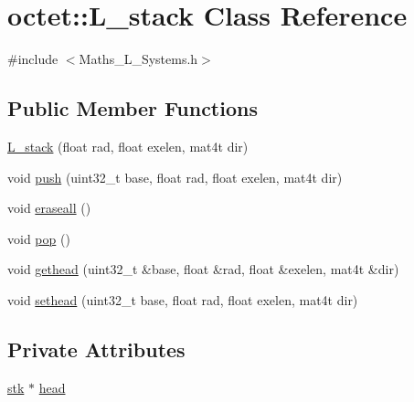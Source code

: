 \hypertarget{classoctet_1_1_l__stack}{\section{octet\+:\+:L\+\_\+stack Class Reference}
\label{classoctet_1_1_l__stack}
}


{\ttfamily \#include $<$Maths\+\_\+\+L\+\_\+\+Systems.\+h$>$}

\subsection*{Public Member Functions}
\begin{DoxyCompactItemize}
\item 
\hyperlink{classoctet_1_1_l__stack_ae51f0abbe777ff635c9222baa23ca49b}{L\+\_\+stack} (float rad, float exelen, mat4t dir)
\item 
void \hyperlink{classoctet_1_1_l__stack_a6ef4bc87ed8db542421d2f8d628d21b7}{push} (uint32\+\_\+t base, float rad, float exelen, mat4t dir)
\item 
void \hyperlink{classoctet_1_1_l__stack_a1d826ecee8e7a32fff42793bedbd1988}{eraseall} ()
\item 
void \hyperlink{classoctet_1_1_l__stack_a7801139caf6842abd54c37c1cd230f1d}{pop} ()
\item 
void \hyperlink{classoctet_1_1_l__stack_ac6ac5ce8c5ed4827eb02cae7a1539a61}{gethead} (uint32\+\_\+t \&base, float \&rad, float \&exelen, mat4t \&dir)
\item 
void \hyperlink{classoctet_1_1_l__stack_a1ff9f3feaeb3d9bf3208cedd16e1ccd5}{sethead} (uint32\+\_\+t base, float rad, float exelen, mat4t dir)
\end{DoxyCompactItemize}
\subsection*{Private Attributes}
\begin{DoxyCompactItemize}
\item 
\hyperlink{structoctet_1_1stk}{stk} $\ast$ \hyperlink{classoctet_1_1_l__stack_aa1205f309b7f112f9145596bf1576a7f}{head}
\end{DoxyCompactItemize}


